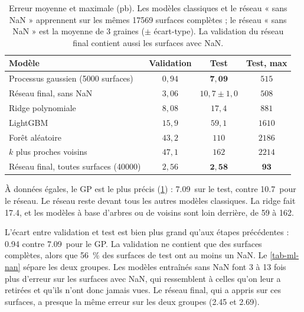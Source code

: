 \begin{table}[H]
  \centering
  \caption{Erreur moyenne et maximale (pb). Les modèles classiques et le réseau « sans NaN » apprennent sur les
  mêmes \num{17569} surfaces complètes ; le réseau « sans NaN » est la moyenne de 3 graines ($\pm$ écart-type).
  La validation du réseau final contient aussi les surfaces avec NaN.}
  \label{tab-ml-precision}
  \small
  \begin{tabular}{lccc}
    \toprule
    Modèle & Validation & Test & Test, max \\
    \midrule
    Processus gaussien (\num{5000} surfaces) & $0{,}94$ & $\mathbf{7{,}09}$ & $515$ \\
    Réseau final, sans NaN                    & $3{,}06$ & $10{,}7 \pm 1{,}0$ & $508$ \\
    Ridge polynomiale                         & $8{,}08$ & $17{,}4$ & $881$ \\
    LightGBM                                  & $15{,}9$ & $59{,}1$ & $1610$ \\
    Forêt aléatoire                           & $43{,}2$ & $110$ & $2186$ \\
    $k$ plus proches voisins                  & $47{,}1$ & $162$ & $2214$ \\
    \midrule
    Réseau final, toutes surfaces (\num{40000}) & $2{,}56$ & $\mathbf{2{,}58}$ & $\mathbf{93}$ \\
    \bottomrule
  \end{tabular}
\end{table}

À données égales, le GP est le plus précis (\cref{tab-ml-precision}) : \num{7.09}\pb\ sur le test, contre
\num{10.7}\pb\ pour le réseau. Le réseau reste devant tous les autres modèles classiques. La ridge fait
\num{17.4}\pb, et les modèles à base d'arbres ou de voisins sont loin derrière, de \num{59} à \num{162}\pb.

L'écart entre validation et test est bien plus grand qu'aux étapes précédentes : \num{0.94} contre
\num{7.09}\pb\ pour le GP. La validation ne contient que des surfaces complètes, alors que \SI{56}{\percent} des
surfaces de test ont au moins un NaN. Le \cref{tab-ml-nan} sépare les deux groupes. Les modèles entraînés sans NaN
font 3 à 13 fois plus d'erreur sur les surfaces avec NaN, qui ressemblent à celles qu'on leur a retirées et qu'ils
n'ont donc jamais vues. Le réseau final, qui a appris sur ces surfaces, a presque la même erreur sur les deux
groupes (\num{2.45} et \num{2.69}\pb).


